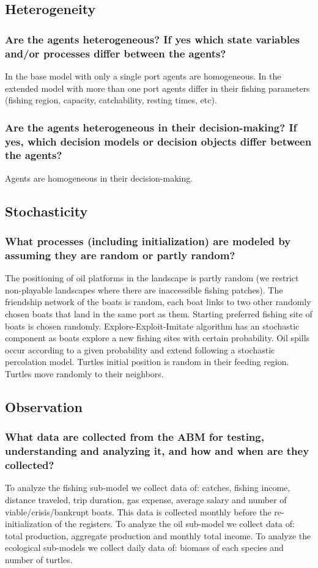 \documentclass[11pt]{article}
\begin{document}
\subsection{Heterogeneity}
\label{sec:orgf1151ed}
\subsubsection{Are the agents heterogeneous? If yes which state variables and/or processes differ between the agents?}
\label{sec:org969225b}
In the base model with only a single port agents are homogeneous. In the extended model with more than one port agents differ in their fishing parameters (fishing region, capacity, catchability, resting times, etc).
\subsubsection{Are the agents heterogeneous in their decision-making? If yes, which decision models or decision objects differ between the agents?}
\label{sec:orged4926b}
Agents are homogeneous in their decision-making.
\subsection{Stochasticity}
\label{sec:orgff836cb}
\subsubsection{What processes (including initialization) are modeled by assuming they are random or partly random?}
\label{sec:orgd748380}
The positioning of oil platforms in the landscape is partly random (we restrict non-playable landscapes where there are inaccessible fishing patches). The friendship network of the boats is random, each boat links to two other randomly chosen boats that land in the same port as them. Starting preferred fishing site of boats is chosen randomly. Explore-Exploit-Imitate algorithm has an stochastic component as boats explore a new fishing sites with certain probability. Oil spills occur according to a given probability and extend following a stochastic percolation model. Turtles initial position is random in their feeding region. Turtles move randomly to their neighbors.
\subsection{Observation}
\label{sec:org2344ec2}
\subsubsection{What data are collected from the ABM for testing, understanding and analyzing it, and how and when are they collected?}
\label{sec:org55dbc45}
To analyze the fishing sub-model we collect data of: catches, fishing income, distance traveled, trip duration, gas expense, average salary and number of viable/crisis/bankrupt boats. This data is collected monthly before the re-initialization of the registers.
To analyze the oil sub-model we collect data of: total production, aggregate production and monthly total income.
To analyze the ecological sub-models we collect daily data of: biomass of each species and number of turtles. 
\end{document}
